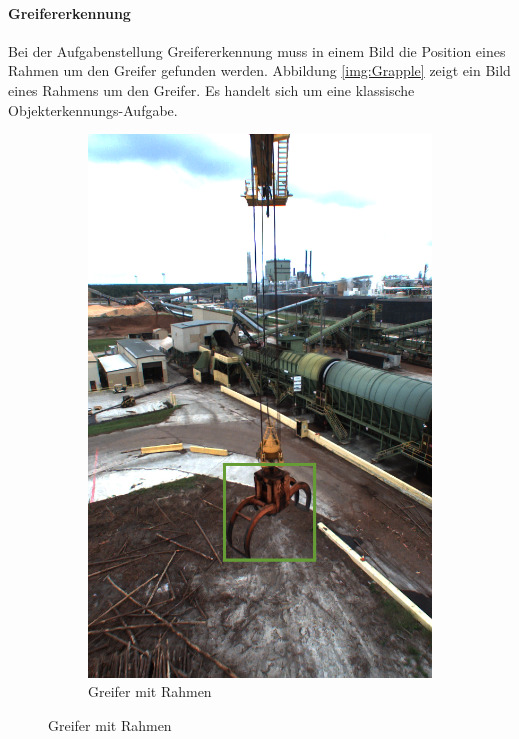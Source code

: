 	\paragraph{Greifererkennung} Bei der Aufgabenstellung Greifererkennung muss in einem Bild die Position eines Rahmen um den Greifer gefunden werden. Abbildung \ref{img:Grapple} zeigt ein Bild eines Rahmens um den Greifer. Es handelt sich um eine klassische Objekterkennungs-Aufgabe.
	\begin{figure}[h]
		\centering
		\begin{subfigure}[c]{0.49\textwidth}			
			\includegraphics[width=1\textwidth, center]{bilder/Grundlagen/Grapple_8.png}
			\caption[Bsp. Bild: Greifer mit Rahmen]{Greifer mit Rahmen}

\end{subfigure}
\end{figure}
